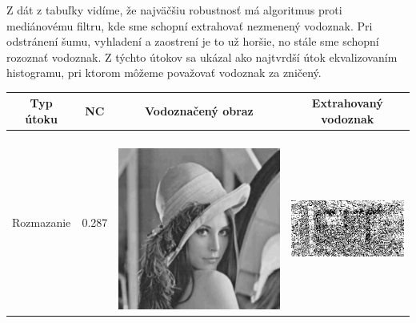 Z dát z tabuľky vidíme, že najväčšiu robustnosť má algoritmus proti mediánovému filtru, kde sme schopní extrahovať nezmenený vodoznak. Pri odstránení šumu, vyhladení a zaostrení je to už horšie, no stále sme schopní rozoznať vodoznak. Z týchto útokov sa ukázal ako najtvrdší útok ekvalizovaním histogramu, pri ktorom môžeme považovať vodoznak za zničený.
\begin{table}[h]
\centering
\label{enhance-table}
\begin{tabular}{llcc}
\hline
\multicolumn{1}{c}{\textbf{Typ útoku}} & \multicolumn{1}{c}{\textbf{NC}} & \multicolumn{1}{c}{\textbf{Vodoznačený obraz}} & \multicolumn{1}{c}{\textbf{Extrahovaný vodoznak}} \\ \hline
Rozmazanie                             & 0.287 &
\begin{minipage}[c]{.1\textwidth}
\ 
  \includegraphics[scale=0.1]{obrazky/blur}
\end{minipage} &
\begin{minipage}[c]{.15\textwidth}
\ 
  \includegraphics[scale=0.25]{obrazky/blur-wm}

\end{minipage}
\end{tabular}
\end{table}

